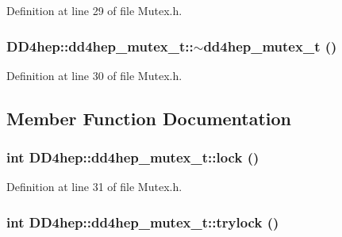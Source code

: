 Definition at line 29 of file Mutex.h.\hypertarget{struct_d_d4hep_1_1dd4hep__mutex__t_addd31c44ebdd2c7097c4778b3f2b9cb8}{
\subsubsection[{$\sim$dd4hep\_\-mutex\_\-t}]{\setlength{\rightskip}{0pt plus 5cm}DD4hep::dd4hep\_\-mutex\_\-t::$\sim$dd4hep\_\-mutex\_\-t ()}}
\label{struct_d_d4hep_1_1dd4hep__mutex__t_addd31c44ebdd2c7097c4778b3f2b9cb8}


Definition at line 30 of file Mutex.h.

\subsection{Member Function Documentation}
\hypertarget{struct_d_d4hep_1_1dd4hep__mutex__t_a7d871d008c53d730b892d64cf0b49e29}{
\subsubsection[{lock}]{\setlength{\rightskip}{0pt plus 5cm}int DD4hep::dd4hep\_\-mutex\_\-t::lock ()}}
\label{struct_d_d4hep_1_1dd4hep__mutex__t_a7d871d008c53d730b892d64cf0b49e29}


Definition at line 31 of file Mutex.h.\hypertarget{struct_d_d4hep_1_1dd4hep__mutex__t_a71b8088c0188d51c0433eda5556e4189}{
\subsubsection[{trylock}]{\setlength{\rightskip}{0pt plus 5cm}int DD4hep::dd4hep\_\-mutex\_\-t::trylock ()}}
\label{struct_d_d4hep_1_1dd4hep__mutex__t_a71b8088c0188d51c0433eda5556e4189}


